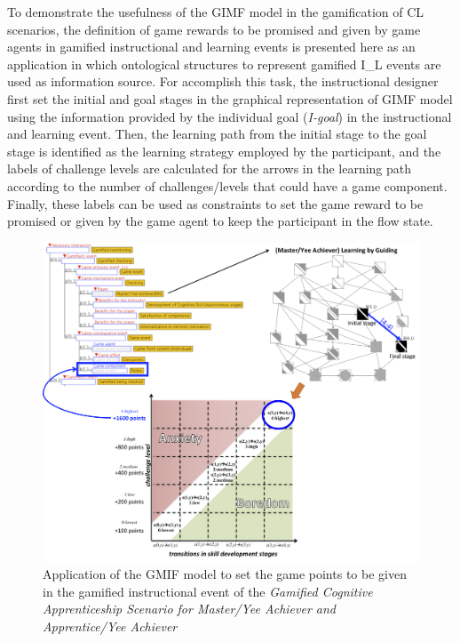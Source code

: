 To demonstrate the usefulness of the GIMF model in the gamification of CL scenarios, the definition of game rewards to be promised and given by game agents in gamified instructional and learning events is presented here as an application in which ontological structures to represent gamified I\_L events are used as information source. For accomplish this task, the instructional designer first set the initial and goal stages in the graphical representation of GIMF model using the information provided by the individual goal (\emph{I-goal}) in the instructional and learning event. Then, the learning path from the initial stage to the goal stage is identified as the learning strategy employed by the participant, and the labels of challenge levels are calculated for the arrows in the learning path according to the number of challenges/levels that could have a game component. Finally, these labels can be used as constraints to set the game reward to be promised or given by the game agent to keep the participant in the flow state.

\begin{figure}[htb]
 \caption{Application of the GMIF model to set the game points to be given in the gamified instructional event  of the \emph{Gamified Cognitive Apprenticeship Scenario for Master/Yee Achiever and Apprentice/Yee Achiever}}
 \label{fig:set-game-reward-gamified-checking}
 \centering
 \includegraphics[width=1\textwidth]{images/chap-model-gmif/set-game-reward-gamified-checking.png}
 \fautor
\end{figure}

